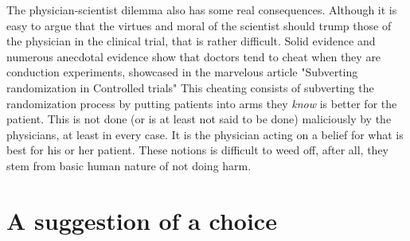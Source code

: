 \documentclass[12p]{article}
\begin{document}
The physician-scientist dilemma also has some real consequences.
Although it is easy to argue that the virtues and moral of the scientist should trump those of the physician in the clinical trial, that is rather difficult.
Solid evidence and numerous anecdotal evidence show that doctors tend to cheat when they are conduction experiments, showcased in the marvelous article "Subverting randomization in Controlled trials" \cite{mdcheat}
This cheating consists of subverting the randomization process by putting patients into arms they \emph{know} is better for the patient.
This is not done (or is at least not said to be done) maliciously by the physicians, at least in every case.
It is the physician acting on a belief for what is best for his or her patient.
These notions is difficult to weed off, after all, they stem from basic human nature of not doing harm.

\section*{A suggestion of a choice}
\end{document}
